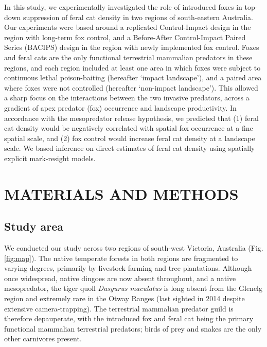 \documentclass[]{elsarticle} %
\begin{document}
In this study, we experimentally investigated the role of introduced foxes in top-down suppression of feral cat density in two regions of south-eastern Australia. Our experiments were based around a replicated Control-Impact design in the region with long-term fox control, and a Before-After Control-Impact Paired Series (BACIPS) design in the region with newly implemented fox control. Foxes and feral cats are the only functional terrestrial mammalian predators in these regions, and each region included at least one area in which foxes were subject to continuous lethal poison-baiting (hereafter `impact landscape'), and a paired area where foxes were not controlled (hereafter `non-impact landscape'). This allowed a sharp focus on the interactions between the two invasive predators, across a gradient of apex predator (fox) occurrence and landscape productivity. In accordance with the mesopredator release hypothesis, we predicted that (1) feral cat density would be negatively correlated with spatial fox occurrence at a fine spatial scale, and (2) fox control would increase feral cat density at a landscape scale. We based inference on direct estimates of feral cat density using spatially explicit mark-resight models.

\newpage

\hypertarget{materials-and-methods}{%
\section{MATERIALS AND METHODS}\label{materials-and-methods}}

\hypertarget{study-area}{%
\subsection{Study area}\label{study-area}}

We conducted our study across two regions of south-west Victoria, Australia (Fig. \ref{fig:map}). The native temperate forests in both regions are fragmented to varying degrees, primarily by livestock farming and tree plantations. Although once widespread, native dingoes are now absent throughout, and a native mesopredator, the tiger quoll \emph{Dasyurus maculatus} is long absent from the Glenelg region and extremely rare in the Otway Ranges (last sighted in 2014 despite extensive camera-trapping). The terrestrial mammalian predator guild is therefore depauperate, with the introduced fox and feral cat being the primary functional mammalian terrestrial predators; birds of prey and snakes are the only other carnivores present.
\end{document}
